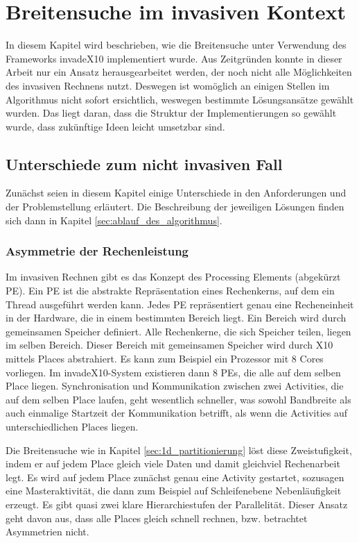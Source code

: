 
\chapter{Breitensuche im invasiven Kontext} %
\label{cha:breitensuche_im_invasiven_kontext}
In diesem Kapitel wird beschrieben, wie die Breitensuche unter Verwendung des Frameworks invadeX10 implementiert wurde. Aus Zeitgründen konnte in dieser Arbeit nur ein Ansatz herausgearbeitet werden, der noch nicht alle Möglichkeiten des invasiven Rechnens nutzt. Deswegen ist womöglich an einigen Stellen im Algorithmus nicht sofort ersichtlich, weswegen bestimmte Lösungsansätze gewählt wurden. Das liegt daran, dass die Struktur der Implementierungen so gewählt wurde, dass zukünftige Ideen leicht umsetzbar sind.

\section{Unterschiede zum nicht invasiven Fall} %
\label{sec:unterschiede_zum_nicht_invasiven_fall}
Zunächst seien in diesem Kapitel einige Unterschiede in den Anforderungen und der Problemstellung erläutert. Die Beschreibung der jeweiligen Lösungen finden sich dann in Kapitel \ref{sec:ablauf_des_algorithmus}.

\subsection{Asymmetrie der Rechenleistung} %
\label{sub:asymmetrie_der_rechenleistung}
Im invasiven Rechnen gibt es das Konzept des Processing Elements (abgekürzt PE). Ein PE ist die abstrakte Repräsentation eines Rechenkerns, auf dem ein Thread ausgeführt werden kann. Jedes PE repräsentiert genau eine Recheneinheit in der Hardware, die in einem bestimmten Bereich liegt. Ein Bereich wird durch gemeinsamen Speicher definiert. Alle Rechenkerne, die sich Speicher teilen, liegen im selben Bereich. Dieser Bereich mit gemeinsamen Speicher wird durch X10 mittels Places abstrahiert. Es kann zum Beispiel ein Prozessor mit 8 Cores vorliegen. Im invadeX10-System existieren dann 8 PEs, die alle auf dem selben Place liegen. Synchronisation und Kommunikation zwischen zwei Activities, die auf dem selben Place laufen, geht wesentlich schneller, was sowohl Bandbreite als auch einmalige Startzeit der Kommunikation betrifft, als wenn die Activities auf unterschiedlichen Places liegen. 

Die Breitensuche wie in Kapitel \ref{sec:1d_partitionierung} löst diese Zweistufigkeit, indem er auf jedem Place gleich viele Daten und damit gleichviel Rechenarbeit legt. Es wird auf jedem Place zunächst genau eine Activity gestartet, sozusagen eine Masteraktivität, die dann zum Beispiel auf Schleifenebene Nebenläufigkeit erzeugt. Es gibt quasi zwei klare Hierarchiestufen der Parallelität. Dieser Ansatz geht davon aus, dass alle Places gleich schnell rechnen, bzw. betrachtet Asymmetrien nicht.

